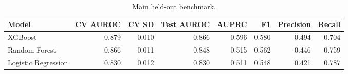\begin{table}[htbp]
\centering
\caption{Main held-out benchmark.}
\label{tab:main_benchmark_recomputed}
\begin{tabular}{lrrrrrrr}
\toprule
Model & CV AUROC & CV SD & Test AUROC & AUPRC & F1 & Precision & Recall \\
\midrule
XGBoost & 0.879 & 0.010 & 0.866 & 0.596 & 0.580 & 0.494 & 0.704 \\
Random Forest & 0.866 & 0.011 & 0.848 & 0.515 & 0.562 & 0.446 & 0.759 \\
Logistic Regression & 0.830 & 0.012 & 0.830 & 0.511 & 0.548 & 0.421 & 0.787 \\
\bottomrule
\end{tabular}

\end{table}
